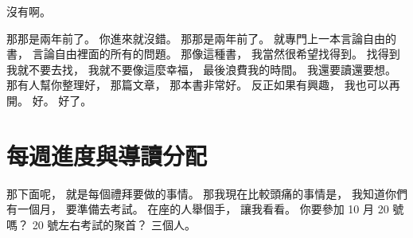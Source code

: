 \hypertarget{w01:cue:600}{}沒有啊。

\hypertarget{w01:cue:601}{}那那是兩年前了。
\hypertarget{w01:cue:602}{}你進來就沒錯。
\hypertarget{w01:cue:603}{}那那是兩年前了。
\hypertarget{w01:cue:604}{}就專門上一本言論自由的書，
\hypertarget{w01:cue:605}{}言論自由裡面的所有的問題。
\hypertarget{w01:cue:606}{}那像這種書，
\hypertarget{w01:cue:607}{}我當然很希望找得到。
\hypertarget{w01:cue:608}{}找得到我就不要去找，
\hypertarget{w01:cue:609}{}我就不要像這麼幸福，
\hypertarget{w01:cue:610}{}最後浪費我的時間。
\hypertarget{w01:cue:611}{}我還要讀還要想。
\hypertarget{w01:cue:612}{}那有人幫你整理好，
\hypertarget{w01:cue:613}{}那篇文章，
\hypertarget{w01:cue:614}{}那本書非常好。
\hypertarget{w01:cue:615}{}反正如果有興趣，
\hypertarget{w01:cue:616}{}我也可以再開。
\hypertarget{w01:cue:617}{}好。
\hypertarget{w01:cue:618}{}好了。

\section{每週進度與導讀分配}

\hypertarget{w01:cue:619}{}那下面呢，
\hypertarget{w01:cue:620}{}就是每個禮拜要做的事情。
\hypertarget{w01:cue:621}{}那我現在比較頭痛的事情是，
\hypertarget{w01:cue:622}{}我知道你們有一個月，
\hypertarget{w01:cue:623}{}要準備去考試。
\hypertarget{w01:cue:624}{}在座的人舉個手，
\hypertarget{w01:cue:625}{}讓我看看。
\hypertarget{w01:cue:626}{}你要參加 10 月 20 號嗎？
\hypertarget{w01:cue:627}{}20 號左右考試的聚首？
\hypertarget{w01:cue:628}{}三個人。

